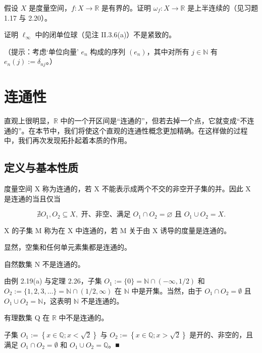 \begin{exercises}
\item

假设 $X$ 是度量空间，$f: X \to \mathbb{R}$ 是有界的。证明 $\omega_f: X \to \mathbb{R}$ 是上半连续的（见习题 1.17 与 2.20）。

\item

证明 $ \ell_{\infty} $ 中的闭单位球（见注 II.3.6(a)）不是紧致的。

（提示：考虑‘单位向量’ $ e_n $ 构成的序列 $ (e_n) $，其中对所有 $ j \in \mathbb{N} $ 有 $ e_n(j) := \delta_{nj} $。）

\end{exercises}

\section{连通性}

直观上很明显，$ \mathbb{R} $ 中的一个开区间是“连通的”，但若去掉一个点，它就变成“不连通的”。在本节中，我们将使这个直观的连通性概念更加精确。在这样做的过程中，我们再次发现拓扑起着本质的作用。

\subsection*{定义与基本性质}

度量空间 X 称为连通的，若 X 不能表示成两个不交的非空开子集的并。因此 X 是连通的当且仅当

\[
\nexists O_{1},O_{2}\subseteq X,\text{ 开、非空、满足 }O_{1}\cap O_{2}=\varnothing\text{ 且 }O_{1}\cup O_{2}=X.
\]

X 的子集 M 称为在 X 中连通的，若 M 关于由 X 诱导的度量是连通的。

\begin{example}

\begin{items}
\item

显然，空集和任何单元素集都是连通的。

\item

自然数集 N 不是连通的。

\proofhead
由例 2.19(a) 与定理 2.26，子集 $ O_1 := \{0\} = \mathbb{N} \cap (-\infty, 1/2) $ 和 $ O_2 := \{1, 2, 3, \ldots\} = \mathbb{N} \cap (1/2, \infty) $ 在 $ \mathbb{N} $ 中是开集。当然，由于 $ O_1 \cap O_2 = \emptyset $ 且 $ O_1 \cup O_2 = \mathbb{N} $，这表明 $ \mathbb{N} $ 不是连通的。
\item

有理数集 Q 在 $ \mathbb{R} $ 中不是连通的。

\proofhead
子集 $O_1 := \left\{ x \in \mathbb{Q} ; x < \sqrt{2} \right\}$ 与 $O_2 := \left\{ x \in \mathbb{Q} ; x > \sqrt{2} \right\}$ 是开的、非空的，且满足 $O_1 \cap O_2 = \emptyset$ 和 $O_1 \cup O_2 = \mathbb{Q}$。■
\end{items}

\end{example}


